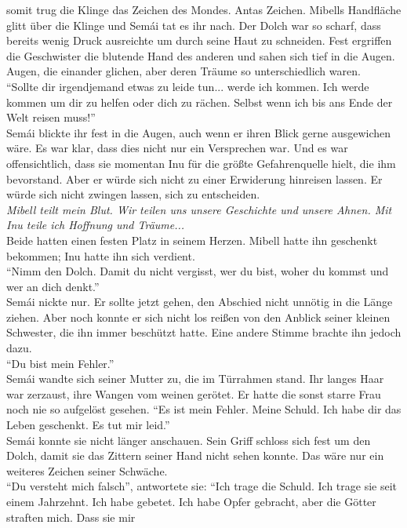 somit trug die Klinge das Zeichen des Mondes. Antas Zeichen. Mibells Handfläche glitt über die 
Klinge und Semái tat es ihr nach. Der Dolch war so scharf, dass bereits wenig Druck ausreichte um 
durch seine Haut zu schneiden. Fest ergriffen die Geschwister die blutende Hand des anderen und 
sahen sich tief in die Augen. Augen, die einander glichen, aber deren Träume so unterschiedlich 
waren. \\
``Sollte dir irgendjemand etwas zu leide tun... werde ich kommen. Ich werde kommen um dir zu helfen 
oder dich zu rächen. Selbst wenn ich bis ans Ende der Welt reisen muss!''\\
Semái blickte ihr fest in die Augen, auch wenn er ihren Blick gerne ausgewichen wäre. Es war klar, 
dass dies nicht nur ein Versprechen war. Und es war offensichtlich, dass sie momentan Inu für die 
größte Gefahrenquelle hielt, die ihm bevorstand. Aber er würde sich nicht zu einer Erwiderung 
hinreisen lassen. Er würde sich nicht zwingen lassen, sich zu entscheiden. \\
\textit{Mibell teilt mein Blut. Wir teilen uns unsere Geschichte und unsere Ahnen. Mit Inu teile 
ich Hoffnung und Träume...}\\
Beide hatten einen festen Platz in seinem Herzen. Mibell hatte ihn geschenkt bekommen; Inu hatte 
ihn sich verdient. \\
``Nimm den Dolch. Damit du nicht vergisst, wer du bist, woher du kommst und wer an dich denkt.''\\
Semái nickte nur. Er sollte jetzt gehen, den Abschied nicht unnötig in die Länge ziehen. Aber noch 
konnte er sich nicht los reißen von den Anblick seiner kleinen Schwester, die ihn immer beschützt 
hatte. Eine andere Stimme brachte ihn jedoch dazu.\\
``Du bist mein Fehler.''\\
Semái wandte sich seiner Mutter zu, die im Türrahmen stand. Ihr langes Haar war zerzaust, ihre 
Wangen vom weinen gerötet. Er hatte die sonst starre Frau noch nie so aufgelöst gesehen. ``Es ist 
mein Fehler. Meine Schuld. Ich habe dir das Leben geschenkt. Es tut mir leid.''\\
Semái konnte sie nicht länger anschauen. Sein Griff schloss sich fest um den Dolch, damit sie das 
Zittern seiner Hand nicht sehen konnte. Das wäre nur ein weiteres Zeichen seiner Schwäche. \\
``Du versteht mich falsch'', antwortete sie: ``Ich trage die Schuld. Ich trage sie seit einem 
Jahrzehnt. Ich habe gebetet. Ich habe Opfer gebracht, aber die Götter straften mich. Dass sie mir 
